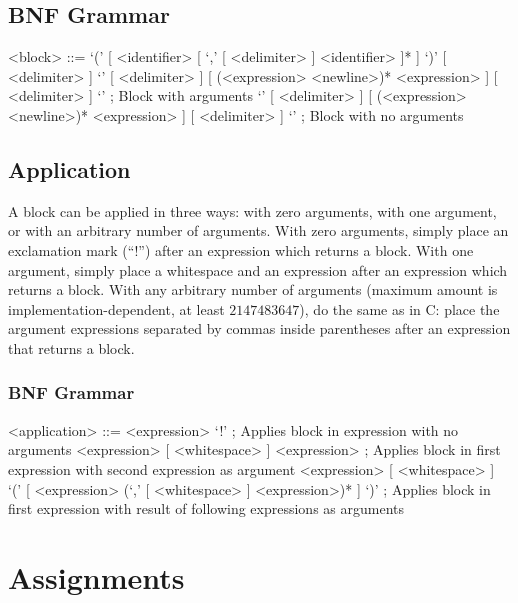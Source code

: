\documentclass[letterpaper,titlepage]{scrreprt}
\begin{document}
\subsection{BNF Grammar}
\label{subsec:BlockBNF}

\begin{grammar}

<block> ::= `(' [ <identifier> [ `,' [ <delimiter> ] <identifier> ]* ] `)' [ <delimiter> ] `{' [ <delimiter> ] [ (<expression> <newline>)* <expression> ] [ <delimiter> ] `}' ; Block with arguments
\alt `{' [ <delimiter> ] [ (<expression> <newline>)* <expression> ] [ <delimiter> ] `}' ; Block with no arguments

\end{grammar}

\subsection{Application}
\label{subsec:Application}

A block can be applied in three ways: with zero arguments, with one argument, or with an arbitrary number of arguments. With zero arguments, simply place an exclamation mark (``!'') after an expression which returns a block. With one argument, simply place a whitespace and an expression after an expression which returns a block. With any arbitrary number of arguments (maximum amount is implementation-dependent, at least $2147483647$), do the same as in C: place the argument expressions separated by commas inside parentheses after an expression that returns a block.

\subsubsection{BNF Grammar}
\label{subsubsec:ApplicationBNF}

\begin{grammar}

<application> ::= <expression> `!' ; Applies block in expression with no arguments
\alt <expression> [ <whitespace> ] <expression> ; Applies block in first expression with second expression as argument
\alt <expression> [ <whitespace> ] `(' [ <expression> (`,' [ <whitespace> ] <expression>)* ] `)' ; Applies block in first expression with result of following expressions as arguments

\end{grammar}

\section{Assignments}
\label{sec:Assignments}
\end{document}

